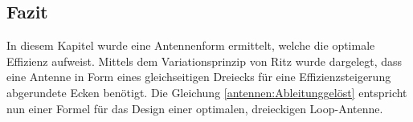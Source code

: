 \subsection{Fazit\label{antennen:fazit}}
In diesem Kapitel wurde eine Antennenform ermittelt, welche die optimale Effizienz aufweist. Mittels dem Variationsprinzip von Ritz wurde dargelegt, dass eine Antenne in Form eines gleichseitigen Dreiecks für eine Effizienzsteigerung abgerundete Ecken benötigt. Die Gleichung \eqref{antennen:Ableitunggelöst} entspricht nun einer Formel für das Design einer optimalen, dreieckigen Loop-Antenne. 
